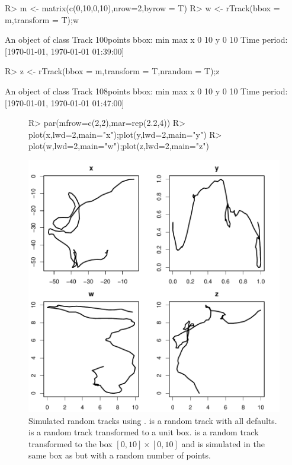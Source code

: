 \documentclass[article]{jss}
\begin{document}
\begin{Sinput}
R> m <- matrix(c(0,10,0,10),nrow=2,byrow = T)
R> w <- rTrack(bbox = m,transform = T);w
\end{Sinput}
\begin{Soutput}
An object of class Track 
100points 
bbox: 
  min max
x   0  10
y   0  10
Time period: [1970-01-01, 1970-01-01 01:39:00]
\end{Soutput}
\begin{Sinput}
R> z <- rTrack(bbox = m,transform = T,nrandom = T);z
\end{Sinput}
\begin{Soutput}
An object of class Track 
108points 
bbox: 
  min max
x   0  10
y   0  10
Time period: [1970-01-01, 1970-01-01 01:47:00]
\end{Soutput}
\begin{figure}[!h]
\begin{center}
\begin{Sinput}
R> par(mfrow=c(2,2),mar=rep(2.2,4))
R> plot(x,lwd=2,main="x");plot(y,lwd=2,main="y")
R> plot(w,lwd=2,main="w");plot(z,lwd=2,main="z")
\end{Sinput}
\includegraphics{article-013}
\end{center}
\caption{Simulated random tracks using .  is a random track with all defaults.  is a random track transformed to a unit box.  is a random track transformed to the box $[0,10]\times [0,10]$ and  is simulated in the same box as  but with a random number of points.}
\label{randomtracks}
\end{figure}
\end{document}
